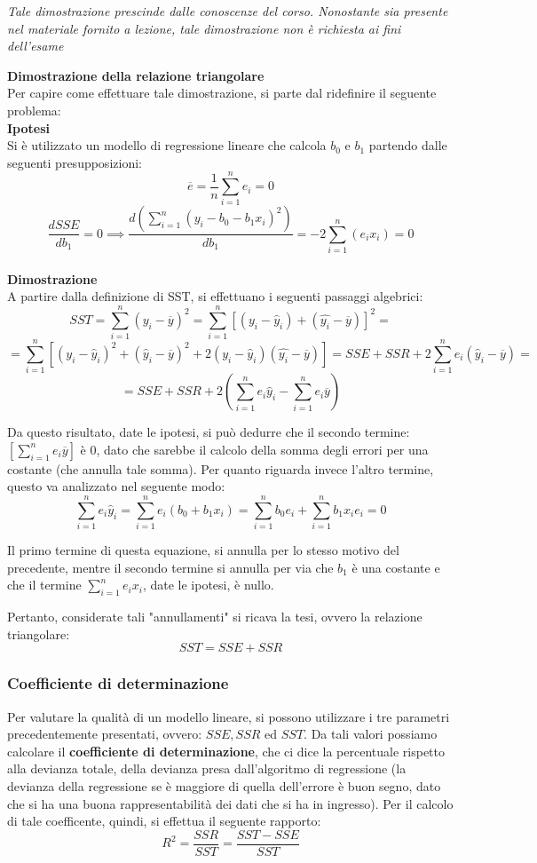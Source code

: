 \begin{info}
\textit{Tale dimostrazione prescinde dalle conoscenze del corso. Nonostante sia presente nel materiale fornito a lezione, tale dimostrazione non è richiesta ai fini dell'esame}

\textbf{Dimostrazione della relazione triangolare}
\\
Per capire come effettuare tale dimostrazione, si parte dal ridefinire il seguente problema:
\\
\textbf{Ipotesi}
\\
Si è utilizzato un modello di regressione lineare che calcola \(b_0\) e \(b_1\) partendo dalle seguenti presupposizioni:
\[
\overline{e} = \frac{1}{n}\sum_{i=1}^{n}e_i = 0
\]
\[
\frac{dSSE}{db_1} = 0 \implies \frac{d(\sum_{i=1}^{n}(y_i - b_0 - b_1x_i)^2)}{db_1} = -2\sum_{i=1}^{n}(e_i x_i) = 0
\]
\\
\textbf{Dimostrazione}
\\
A partire dalla definizione di SST, si effettuano i seguenti passaggi algebrici:
\[
SST = \sum_{i=1}^{n}(y_i - \overline{y})^2 = \sum_{i=1}^{n}[(y_i - \hat{y}_i) + (\hat{y_i} - \overline{y})]^2=
\]
\[
= \sum_{i=1}^{n}[(y_i - \hat{y}_i)^2 + (\hat{y}_i - \overline{y})^2 + 2 (y_i - \hat{y}_i) (\hat{y_i} - \overline{y})] = SSE + SSR + 2 \sum_{i=1}^{n}e_i(\hat{y}_i - \overline{y}) = 
\]
\[
= SSE + SSR + 2 (\sum_{i=1}^{n}e_i \hat{y}_i - \sum_{i=1}^{n}e_i \overline{y})
\]

Da questo risultato, date le ipotesi, si può dedurre che il secondo termine: \(\left [ \sum_{i=1}^{n}e_i \overline{y}\right ]\) è 0, dato che sarebbe il calcolo della somma degli errori per una costante (che annulla tale somma). Per quanto riguarda invece l'altro termine, questo va analizzato nel seguente modo:
\[
\sum_{i=1}^{n}e_i \hat{y}_i = \sum_{i=1}^{n}e_i (b_0 + b_1 x_i) = \sum_{i=1}^{n}b_0 e_i + \sum_{i=1}^{n}b_1 x_i e_i = 0
\]

Il primo termine di questa equazione, si annulla per lo stesso motivo del precedente, mentre il secondo termine si annulla per via che \(b_1\) è una costante e che il termine \(\sum_{i=1}^{n}e_i x_i\), date le ipotesi, è nullo.

Pertanto, considerate tali "annullamenti" si ricava la tesi, ovvero la relazione triangolare:
\[
SST = SSE + SSR
\]
\end{info}

\subsubsection{Coefficiente di determinazione}
Per valutare la qualità di un modello lineare, si possono utilizzare i tre parametri precedentemente presentati, ovvero: \(SSE, SSR\) ed \(SST\). Da tali valori possiamo calcolare il \textbf{coefficiente di determinazione}, che ci dice la percentuale rispetto alla devianza totale, della devianza presa dall'algoritmo di regressione (la devianza della regressione se è maggiore di quella dell'errore è buon segno, dato che si ha una buona rappresentabilità dei dati che si ha in ingresso). Per il calcolo di tale coefficente, quindi, si effettua il seguente rapporto:
\[
R^2 = \frac{SSR}{SST} = \frac{SST-SSE}{SST}
\]

